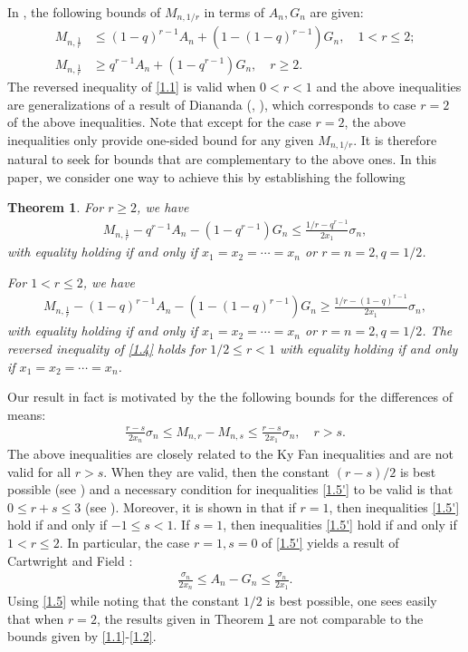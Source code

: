 \documentclass[11pt]{amsart}
\newtheorem{theorem}{Theorem}[section]
\numberwithin{equation}{section}
\theoremstyle{definition}
\theoremstyle{remark}
\begin{document}
   In \cite{G5}, the following bounds of $M_{n,1/r}$ in terms of $A_n, G_n$ are given:
\begin{align}
\label{1.1}
     M_{n,\frac {1}{r}} & \leq (1-q)^{r-1} A_n +(1-(1-q)^{r-1}) G_n, \quad 1 < r \leq 2 ; \\
\label{1.2}
    M_{n,\frac {1}{r}} & \geq q^{r-1} A_n +(1-q^{r-1}) G_n, \quad r \geq 2.
\end{align}
   The reversed inequality of \eqref{1.1} is valid when $0<r<1$ and the above inequalities are generalizations of a result of Diananda (\cite{dian}, \cite{dian1}), which corresponds to case $r=2$ of the above inequalities. Note that except for the case $r=2$, the above inequalities only provide one-sided bound for any given $M_{n,1/r}$. It is therefore natural to seek for bounds that are complementary to the above ones. In this paper, we consider one way to achieve this by establishing
    the following
\begin{theorem}
\label{thm1}
   For $r \geq 2$, we have
\begin{align}
\label{1.3}
    M_{n,\frac {1}{r}}-q^{r-1} A_n -(1-q^{r-1}) G_n \leq \frac
   {1/r-q^{r-1}}{2x_1}\sigma_n,
\end{align}
   with equality holding if and only if $x_1=x_2=\cdots=x_n$ or $r=n=2,
    q=1/2$.

    For $1< r \leq 2$, we have
\begin{align}
\label{1.4}
   M_{n,\frac {1}{r}}-(1-q)^{r-1} A_n -(1-(1-q)^{r-1}) G_n \geq \frac
   {1/r-(1-q)^{r-1}}{2x_1}\sigma_n,
\end{align}
   with equality holding if and only if $x_1=x_2=\cdots=x_n$ or $r=n=2,
    q=1/2$. The reversed inequality of \eqref{1.4} holds for $1/2 \leq r<1$ with
 equality holding if and only if $x_1=x_2=\cdots=x_n$.
\end{theorem}

     Our result in fact is motivated by the the following bounds for the differences of means:
\begin{align}
\label{1.5'}
    \frac {r-s}{2x_n}\sigma_n \leq M_{n,r}-M_{n,s} \leq \frac {r-s}{2x_1} \sigma_n , \quad r>s.
\end{align}
    The above inequalities are closely related to the Ky Fan inequalities and are not valid for all $r>s$. When they are valid, then the constant $(r-s)/2$ is best possible (see \cite{G4}) and a necessary condition for inequalities \eqref{1.5'} to be valid is that $0 \leq r+s \leq 3$ (see \cite[Lemma 3.1]{G4}).
    Moreover, it is shown in \cite[Theorem 3.2]{G4} that if $r = 1$, then inequalities \eqref{1.5'} hold if and only if $-1 \leq s <1$. If $s = 1$, then inequalities \eqref{1.5'} hold if and only if $1 < r \leq 2$. In particular, the case $r=1,s=0$ of \eqref{1.5'} yields a result of Cartwright and Field \cite{C&F}:
\begin{align}
\label{1.5}
   \frac {\sigma_n}{2x_n}
    \leq   A_n-G_n  \leq  \frac {\sigma_n}{2x_1}.
\end{align}
    Using \eqref{1.5} while noting that the constant $1/2$ is best possible, one sees easily that when $r=2$, the results given in Theorem \ref{thm1} are not comparable to the bounds given by \eqref{1.1}-\eqref{1.2}.
\end{document}
